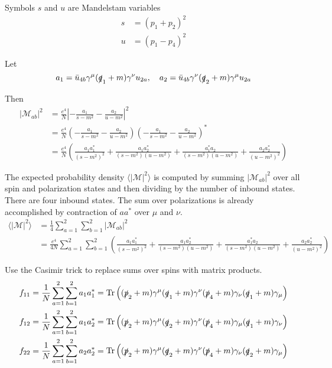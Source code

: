 \documentclass[12pt]{article}
\begin{document}
\noindent
Symbols $s$ and $u$ are Mandelstam variables
\begin{align*}
s&=(p_1+p_2)^2
\\
u&=(p_1-p_4)^2
\end{align*}

\noindent
Let
\begin{equation*}
a_1=\bar{u}_{4b}\gamma^\mu(\slashed{q}_1+m)\gamma^\nu u_{2a},
\quad
a_2=\bar{u}_{4b}\gamma^\nu(\slashed{q}_2+m)\gamma^\mu u_{2a}
\end{equation*}

\noindent
Then
\begin{align*}
|\mathcal{M}_{ab}|^2&=\frac{e^4}{N}\left|-\frac{a_1}{s-m^2}-\frac{a_2}{u-m^2}\right|^2\\
&=
\frac{e^4}{N}
\left(-\frac{a_1}{s-m^2}-\frac{a_2}{u-m^2}\right)
\left(-\frac{a_1}{s-m^2}-\frac{a_2}{u-m^2}\right)^*\\
&=
\frac{e^4}{N}\left(
\frac{a_1a_1^*}{(s-m^2)^2}
+\frac{a_1a_2^*}{(s-m^2)(u-m^2)}
+\frac{a_1^*a_2}{(s-m^2)(u-m^2)}
+\frac{a_2a_2^*}{(u-m^2)^2}
\right)
\end{align*}

\noindent
The expected probability density $\langle|\mathcal{M}|^2\rangle$ is
computed by summing $|\mathcal{M}_{ab}|^2$ over all spin and polarization states
and then dividing by the number of inbound states.
There are four inbound states.
The sum over polarizations is already accomplished by contraction of $aa^*$ over $\mu$ and $\nu$.
\begin{align*}
\langle|\mathcal{M}|^2\rangle
&=\frac{1}{4}\sum_{a=1}^2\sum_{b=1}^2|\mathcal{M}_{ab}|^2\\
&=\frac{e^4}{4N}\sum_{a=1}^2\sum_{b=1}^2
\left(
\frac{a_1a_1^*}{(s-m^2)^2}
+\frac{a_1a_2^*}{(s-m^2)(u-m^2)}
+\frac{a_1^*a_2}{(s-m^2)(u-m^2)}
+\frac{a_2a_2^*}{(u-m^2)^2}
\right)
\end{align*}

\noindent
Use the Casimir trick to replace sums over spins with matrix products.
\begin{align*}
f_{11}&=\frac{1}{N} \sum_{a=1}^2\sum_{b=1}^2 a_1a_1^*=\mathop{\rm Tr}
\left(
(\slashed{p}_2+m)\gamma^\mu(\slashed{q}_1+m)\gamma^\nu(\slashed{p}_4+m)\gamma_\nu(\slashed{q}_1+m)\gamma_\mu
\right)
\\
f_{12}&=\frac{1}{N} \sum_{a=1}^2\sum_{b=1}^2 a_1a_2^*=\mathop{\rm Tr}
\left(
(\slashed{p}_2+m)\gamma^\mu(\slashed{q}_2+m)\gamma^\nu(\slashed{p}_4+m)\gamma_\mu(\slashed{q}_1+m)\gamma_\nu
\right)
\\
f_{22}&=\frac{1}{N} \sum_{a=1}^2\sum_{b=1}^2 a_2a_2^*=\mathop{\rm Tr}
\left(
(\slashed{p}_2+m)\gamma^\mu(\slashed{q}_2+m)\gamma^\nu(\slashed{p}_4+m)\gamma_\nu(\slashed{q}_2+m)\gamma_\mu
\right)
\end{align*}
\end{document}
